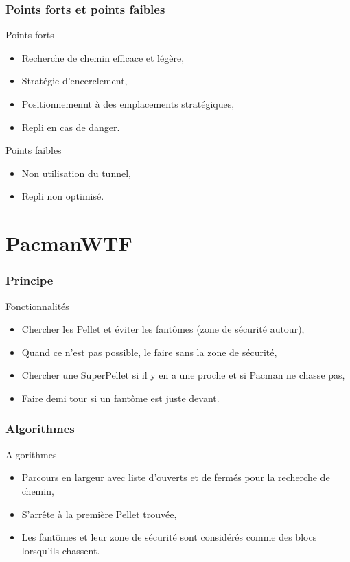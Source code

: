 \documentclass[c]{beamer}
\begin{document}
\begin{frame}
    \frametitle{Points forts et points faibles}
    \begin{block}{Points forts}
        \begin{itemize}
            \item Recherche de chemin efficace et légère,
            \item Stratégie d'encerclement,
            \item Positionnemennt à des emplacements stratégiques,
            \item Repli en cas de danger.
        \end{itemize}
    \end{block}
    \begin{block}{Points faibles}
        \begin{itemize}
            \item Non utilisation du tunnel,
            \item Repli non optimisé.
        \end{itemize}
    \end{block}
\end{frame}

\section{PacmanWTF}
\begin{frame}
    \frametitle{Principe}
    \begin{block}{Fonctionnalités}
        \begin{itemize}
            \item Chercher les Pellet et éviter les fantômes (zone de sécurité autour),
            \item Quand ce n'est pas possible, le faire sans la zone de sécurité,
            \item Chercher une SuperPellet si il y en a une proche et si Pacman ne chasse pas,
            \item Faire demi tour si un fantôme est juste devant.
        \end{itemize}
    \end{block}
\end{frame}

\begin{frame}
	\frametitle{Algorithmes}
	\begin{block}{Algorithmes}
	\begin{itemize}
        \item Parcours en largeur avec liste d'ouverts et de fermés pour la recherche de chemin,
        \item S'arrête à la première Pellet trouvée,
        \item Les fantômes et leur zone de sécurité sont considérés comme des blocs lorsqu'ils chassent.
	\end{itemize}
	\end{block}
\end{frame}
\end{document}
